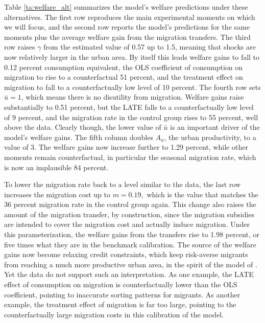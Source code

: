 \documentclass[12pt,pdftex]{article}
\begin{document}
\begin{onehalfspacing}
Table \ref{ta:welfare_alt} summarizes the model's welfare predictions under these alternatives. The first row reproduces the main experimental moments on which we will focus, and the second row reports the model's predictions for the same moments plus the average welfare gain from the migration transfers. The third row raises $\gamma$ from the estimated value of 0.57 up to 1.5, meaning that shocks are now relatively larger in the urban area. By itself this leads welfare gains to fall to 0.12 percent consumption equivalent, the OLS coefficient of consumption on migration to rise to a counterfactual 51 percent, and the treatment effect on migration to fall to a counterfactually low level of 10 percent. The fourth row sets $\bar{u}=1$, which means there is no disutility from migration. Welfare gains raise substantially to 0.51 percent, but the LATE falls to a counterfactually low level of 9 percent, and the migration rate in the control group rises to 55 percent, well above the data. Clearly though, the lower value of $\bar{u}$ is an important driver of the model's welfare gains. The fifth column doubles $A_u$, the urban productivity, to a value of 3. The welfare gains now increase further to 1.29 percent, while other moments remain counterfactual, in particular the seasonal migration rate, which is now an implausible 84 percent.

To lower the migration rate back to a level similar to the data, the last row increases the migration cost up to $m=0.19,$ which is the value that matches the 36 percent migration rate in the control group again. This change also raises the amount of the migration transfer, by construction, since the migration subsidies are intended to cover the migration cost and actually induce migration. Under this parameterization, the welfare gains from the transfers rise to 1.98 percent, or five times what they are in the benchmark calibration. The source of the welfare gains now become relaxing credit constraints, which keep risk-averse migrants from reaching a much more productive urban area, in the spirit of the model of \citet{brch14}. Yet the data do not support such an interpretation. As one example, the LATE effect of consumption on migration is counterfactually lower than the OLS coefficient, pointing to inaccurate sorting patterns for migrants. As another example, the treatment effect of migration is far too large, pointing to the counterfactually large migration costs in this calibration of the model.






\end{onehalfspacing}
\end{document}
